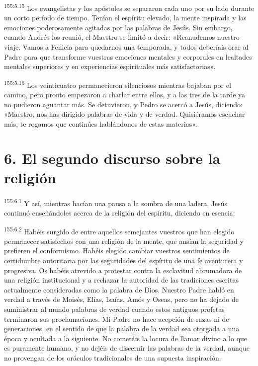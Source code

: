 \par 
\textsuperscript{155:5.15} Los evangelistas y los apóstoles se separaron cada uno por su lado durante un corto período de tiempo. Tenían el espíritu elevado, la mente inspirada y las emociones poderosamente agitadas por las palabras de Jesús. Sin embargo, cuando Andrés los reunió, el Maestro se limitó a decir: «Reanudemos nuestro viaje. Vamos a Fenicia para quedarnos una temporada, y todos deberíais orar al Padre para que transforme vuestras emociones mentales y corporales en lealtades mentales superiores y en experiencias espirituales más satisfactorias».

\par 
\textsuperscript{155:5.16} Los veinticuatro permanecieron silenciosos mientras bajaban por el camino, pero pronto empezaron a charlar entre ellos, y a las tres de la tarde ya no pudieron aguantar más. Se detuvieron, y Pedro se acercó a Jesús, diciendo: «Maestro, nos has dirigido palabras de vida y de verdad. Quisiéramos escuchar más; te rogamos que continúes hablándonos de estas materias».

\section*{6. El segundo discurso sobre la religión}
\par 
\textsuperscript{155:6.1} Y así, mientras hacían una pausa a la sombra de una ladera, Jesús continuó enseñándoles acerca de la religión del espíritu, diciendo en esencia:

\par 
\textsuperscript{155:6.2} Habéis surgido de entre aquellos semejantes vuestros que han elegido permanecer satisfechos con una religión de la mente, que ansían la seguridad y prefieren el conformismo. Habéis elegido cambiar vuestros sentimientos de certidumbre autoritaria por las seguridades del espíritu de una fe aventurera y progresiva. Os habéis atrevido a protestar contra la esclavitud abrumadora de una religión institucional y a rechazar la autoridad de las tradiciones escritas actualmente consideradas como la palabra de Dios. Nuestro Padre habló en verdad a través de Moisés, Elías, Isaías, Amós y Oseas, pero no ha dejado de suministrar al mundo palabras de verdad cuando estos antiguos profetas terminaron sus proclamaciones. Mi Padre no hace acepción de razas ni de generaciones, en el sentido de que la palabra de la verdad sea otorgada a una época y ocultada a la siguiente. No cometáis la locura de llamar divino a lo que es puramente humano, y no dejéis de discernir las palabras de la verdad, aunque no provengan de los oráculos tradicionales de una supuesta inspiración.

